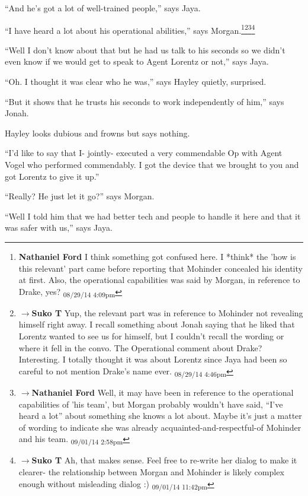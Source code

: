 ``And he's got a lot of well-trained people,'' says Jaya.

``I have heard a lot about his operational abilities,'' says Morgan.\footnote{\textbf{Nathaniel Ford }I think something got confused here. I *think* the 'how is this relevant' part came before reporting that Mohinder concealed his identity at first. Also, the operational capabilities was said by Morgan, in reference to Drake, yes? \textsubscript{08/29/14 4:09pm}}\footnote{$\rightarrow$\textbf{Suko T }Yup, the relevant part was in reference to Mohinder not revealing himself right away.  I recall something about Jonah saying that he liked that Lorentz wanted to see us for himself, but I couldn't recall the wording or where it fell in the convo.  The Operational comment about Drake?   Interesting.  I totally thought it was about Lorentz since Jaya had been so careful to not mention Drake's name ever. \textsubscript{08/29/14 4:46pm}}\footnote{$\rightarrow$\textbf{Nathaniel Ford }Well, it may have been in reference to the operational capabilities of 'his team', but Morgan probably wouldn't have said, ``I've heard a lot'' about something she knows a lot about. Maybe it's just a matter of wording to indicate she was already acquainted-and-respectful-of Mohinder and his team. \textsubscript{09/01/14 2:58pm}}\footnote{$\rightarrow$\textbf{Suko T }Ah, that makes sense.  Feel free to re-write her dialog to make it clearer- the relationship between Morgan and Mohinder is likely complex enough without misleading dialog :) \textsubscript{09/01/14 11:42pm}}

``Well I don't know about that but he had us talk to his seconds so we didn't even know if we would get to speak to Agent Lorentz or not,'' says Jaya.

``Oh.  I thought it was clear who he was,'' says Hayley quietly, surprised.

``But it shows that he trusts his seconds to work independently of him,'' says Jonah.

Hayley looks dubious and frowns but says nothing.

``I'd like to say that I- jointly- executed a very commendable Op with Agent Vogel who performed commendably.  I got the device that we brought to you and got Lorentz to give it up.''

``Really?  He just let it go?'' says Morgan.

``Well I told him that we had better tech and people to handle it here and that it was safer with us,'' says Jaya.

